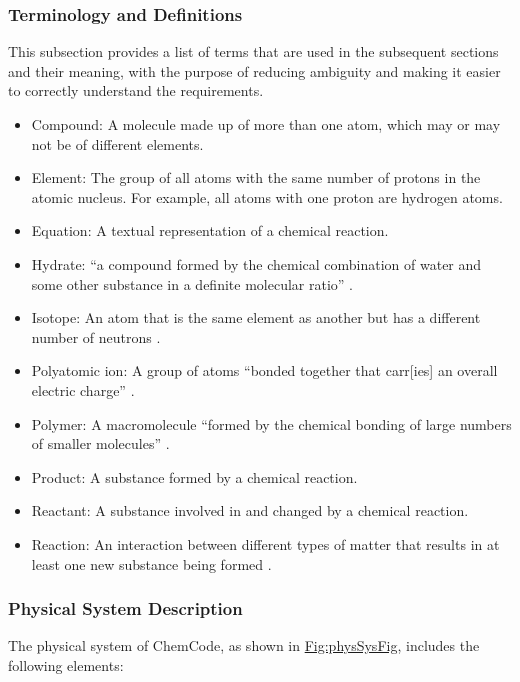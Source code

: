 \documentclass[12pt]{article}
\begin{document}
\subsubsection{Terminology and Definitions}
\label{Sec:TermDefs}
This subsection provides a list of terms that are used in the subsequent sections and their meaning, with the purpose of reducing ambiguity and making it easier to correctly understand the requirements.

\begin{itemize}
\item{Compound: A molecule made up of more than one atom, which may or may not be of different elements.}
\item{Element: The group of all atoms with the same number of protons in the atomic nucleus. For example, all atoms with one proton are hydrogen atoms.}
\item{Equation: A textual representation of a chemical reaction.}
\item{Hydrate: ``a compound formed by the chemical combination of water and some other substance in a definite molecular ratio'' \cite{hydrateSource}.}
\item{Isotope: An atom that is the same element as another but has a different number of neutrons \cite{lund2023}.}
\item{Polyatomic ion: A group of atoms ``bonded together that carr[ies] an overall electric charge'' \cite{lund2023}.}
\item{Polymer: A macromolecule ``formed by the chemical bonding of large numbers of smaller molecules'' \cite{polymerSource}.}
\item{Product: A substance formed by a chemical reaction.}
\item{Reactant: A substance involved in and changed by a chemical reaction.}
\item{Reaction: An interaction between different types of matter that results in at least one new substance being formed \cite{lund2023}.}
\end{itemize}
\subsubsection{Physical System Description}
\label{Sec:PhysSyst}
The physical system of ChemCode, as shown in \hyperref[Figure:physSysFig]{Fig:physSysFig}, includes the following elements:
\end{document}
